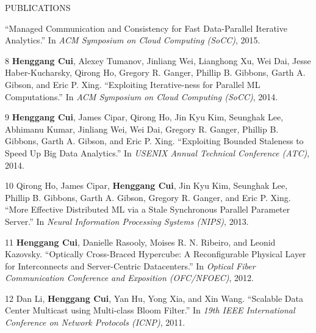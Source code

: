 \documentclass{resume} %
\begin{document}
\begin{rSection}{PUBLICATIONS}
{        ``Managed Communication and Consistency for Fast Data-Parallel Iterative Analytics.''
        In \emph{ACM Symposium on Cloud Computing (SoCC)}, 2015.
    \item
    [8]
        {\bf Henggang Cui}, Alexey Tumanov, Jinliang Wei, Lianghong Xu, Wei Dai, Jesse Haber-Kucharsky, Qirong Ho, Gregory R. Ganger, Phillip B. Gibbons, Garth A. Gibson, and Eric P. Xing.
        ``Exploiting Iterative-ness for Parallel ML Computations.''
        In \emph{ACM Symposium on Cloud Computing (SoCC)}, 2014.
    \item
    [9]
        {\bf Henggang Cui}, James Cipar, Qirong Ho, Jin Kyu Kim, Seunghak Lee, Abhimanu Kumar, Jinliang Wei, Wei Dai, Gregory R. Ganger, Phillip B. Gibbons, Garth A. Gibson, and Eric P. Xing.
        ``Exploiting Bounded Staleness to Speed Up Big Data Analytics.''
        In \emph{USENIX Annual Technical Conference (ATC)}, 2014.
    \item
    [10]
        Qirong Ho, James Cipar, {\bf Henggang Cui}, Jin Kyu Kim, Seunghak Lee, Phillip B. Gibbons, Garth A. Gibson, Gregory R. Ganger, and Eric P. Xing.
        ``More Effective Distributed ML via a Stale Synchronous Parallel Parameter Server.''
        In \emph{Neural Information Processing Systems (NIPS)}, 2013.
    \item
    [11]
        {\bf Henggang Cui}, Danielle Rasooly, Moises R. N. Ribeiro, and Leonid Kazovsky.
        ``Optically Cross-Braced Hypercube: A Reconfigurable Physical Layer for Interconnects and Server-Centric Datacenters.''
        In \emph{Optical Fiber Communication Conference and Exposition (OFC/NFOEC)}, 2012.
    \item
    [12]
        Dan Li, {\bf Henggang Cui}, Yan Hu, Yong Xia, and Xin Wang.
        ``Scalable Data Center Multicast using Multi-class Bloom Filter.''
        In \emph{19th IEEE International Conference on Network Protocols (ICNP)}, 2011.
}
\end{rSection}
\vspace{-.05in}
\end{document}
